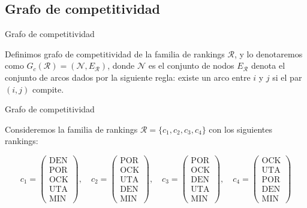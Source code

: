 \documentclass[11pt]{beamer}
\begin{document}
	\subsection{Grafo de competitividad}
	
	\begin{frame}{Grafo de competitividad}
		\begin{defi}
			Definimos grafo de competitividad de la familia de rankings $\mathcal{R}$, y lo denotaremos como $G_c(\mathcal{R}) = (\mathcal{N}, E_\mathcal{R})$, donde $\mathcal{N}$ es el conjunto de nodos $E_\mathcal{R}$ denota el conjunto de arcos dados por la siguiente regla: existe un arco entre $i$ y $j$ si el par $(i,j)$ compite.
		\end{defi}
	\end{frame}
	
	\begin{frame}{Grafo de competitividad}
		\begin{ejemplo}
			Consideremos la familia de rankings $\mathcal{R} = \{c_1, c_2, c_3, c_4\}$ con los siguientes rankings:
			
			\begin{equation*}
			c_1 = \left( \begin{array}{c}
			\text{DEN}\\
			\text{POR}\\
			\text{OCK}\\
			\text{UTA}\\
			\text{MIN}
			\end{array} \right), \quad
			c_2 = \left( \begin{array}{c}
			\text{POR}\\
			\text{OCK}\\
			\text{UTA}\\
			\text{DEN}\\
			\text{MIN}
			\end{array} \right), \quad
			c_3 = \left( \begin{array}{c}
			\text{POR}\\
			\text{OCK}\\
			\text{DEN}\\
			\text{UTA}\\
			\text{MIN}
			\end{array} \right), \quad
			c_4 = \left( \begin{array}{c}
			\text{OCK}\\
			\text{UTA}\\
			\text{POR}\\
			\text{DEN}\\
			\text{MIN}
			\end{array} \right)
			\end{equation*}
		
		\end{ejemplo}
	\end{frame}
	
\end{document}

